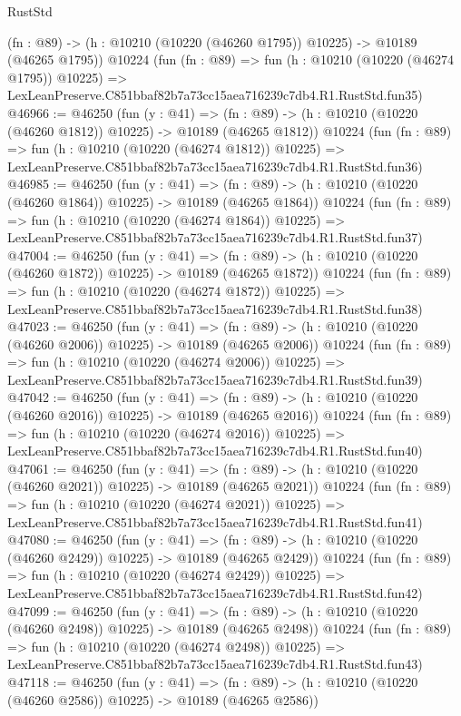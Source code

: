 \begin{lexlean}{RustStd}
\begin{coremodule}
    (fn : @89) -> (h : @10210 (@10220 (@46260 @1795)) @10225) -> @10189 (@46265 @1795))
    @10224
    (fun (fn : @89) =>
    fun (h : @10210 (@10220 (@46274 @1795)) @10225) =>
    LexLeanPreserve.C851bbaf82b7a73cc15aea716239c7db4.R1.RustStd.fun35)
@46966 := @46250
    (fun (y : @41) =>
    (fn : @89) -> (h : @10210 (@10220 (@46260 @1812)) @10225) -> @10189 (@46265 @1812))
    @10224
    (fun (fn : @89) =>
    fun (h : @10210 (@10220 (@46274 @1812)) @10225) =>
    LexLeanPreserve.C851bbaf82b7a73cc15aea716239c7db4.R1.RustStd.fun36)
@46985 := @46250
    (fun (y : @41) =>
    (fn : @89) -> (h : @10210 (@10220 (@46260 @1864)) @10225) -> @10189 (@46265 @1864))
    @10224
    (fun (fn : @89) =>
    fun (h : @10210 (@10220 (@46274 @1864)) @10225) =>
    LexLeanPreserve.C851bbaf82b7a73cc15aea716239c7db4.R1.RustStd.fun37)
@47004 := @46250
    (fun (y : @41) =>
    (fn : @89) -> (h : @10210 (@10220 (@46260 @1872)) @10225) -> @10189 (@46265 @1872))
    @10224
    (fun (fn : @89) =>
    fun (h : @10210 (@10220 (@46274 @1872)) @10225) =>
    LexLeanPreserve.C851bbaf82b7a73cc15aea716239c7db4.R1.RustStd.fun38)
@47023 := @46250
    (fun (y : @41) =>
    (fn : @89) -> (h : @10210 (@10220 (@46260 @2006)) @10225) -> @10189 (@46265 @2006))
    @10224
    (fun (fn : @89) =>
    fun (h : @10210 (@10220 (@46274 @2006)) @10225) =>
    LexLeanPreserve.C851bbaf82b7a73cc15aea716239c7db4.R1.RustStd.fun39)
@47042 := @46250
    (fun (y : @41) =>
    (fn : @89) -> (h : @10210 (@10220 (@46260 @2016)) @10225) -> @10189 (@46265 @2016))
    @10224
    (fun (fn : @89) =>
    fun (h : @10210 (@10220 (@46274 @2016)) @10225) =>
    LexLeanPreserve.C851bbaf82b7a73cc15aea716239c7db4.R1.RustStd.fun40)
@47061 := @46250
    (fun (y : @41) =>
    (fn : @89) -> (h : @10210 (@10220 (@46260 @2021)) @10225) -> @10189 (@46265 @2021))
    @10224
    (fun (fn : @89) =>
    fun (h : @10210 (@10220 (@46274 @2021)) @10225) =>
    LexLeanPreserve.C851bbaf82b7a73cc15aea716239c7db4.R1.RustStd.fun41)
@47080 := @46250
    (fun (y : @41) =>
    (fn : @89) -> (h : @10210 (@10220 (@46260 @2429)) @10225) -> @10189 (@46265 @2429))
    @10224
    (fun (fn : @89) =>
    fun (h : @10210 (@10220 (@46274 @2429)) @10225) =>
    LexLeanPreserve.C851bbaf82b7a73cc15aea716239c7db4.R1.RustStd.fun42)
@47099 := @46250
    (fun (y : @41) =>
    (fn : @89) -> (h : @10210 (@10220 (@46260 @2498)) @10225) -> @10189 (@46265 @2498))
    @10224
    (fun (fn : @89) =>
    fun (h : @10210 (@10220 (@46274 @2498)) @10225) =>
    LexLeanPreserve.C851bbaf82b7a73cc15aea716239c7db4.R1.RustStd.fun43)
@47118 := @46250
    (fun (y : @41) =>
    (fn : @89) -> (h : @10210 (@10220 (@46260 @2586)) @10225) -> @10189 (@46265 @2586))

\end{coremodule}
\end{lexlean}

